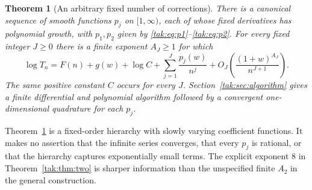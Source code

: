 \documentclass[11pt,letterpaper]{article}
\newtheorem{theorem}{Theorem}[section]
\theoremstyle{remark}\newtheorem{remark}[theorem]{Remark}
\begin{document}
\begin{theorem}[An arbitrary fixed number of corrections]\label{tak:thm:all}
There is a canonical sequence of smooth functions $p_j$ on $[1,\infty)$, each of whose fixed derivatives has polynomial growth, with $p_1,p_2$ given by \eqref{tak:eq:p1}--\eqref{tak:eq:p2}. For every fixed integer $J\geq0$ there is a finite exponent $A_J\geq1$ for which
\begin{equation}
 \log T_n=F(n)+g(w)+\log C+\sum_{j=1}^J\frac{p_j(w)}{n^j}
       +O_J\!\left(\frac{(1+w)^{A_J}}{n^{J+1}}\right).\label{tak:eq:all}
\end{equation}
The same positive constant $C$ occurs for every $J$. Section~\ref{tak:sec:algorithm} gives a finite differential and polynomial algorithm followed by a convergent one-dimensional quadrature for each $p_j$.
\end{theorem}
Theorem~\ref{tak:thm:all} is a fixed-order hierarchy with slowly varying coefficient functions. It makes no assertion that the infinite series converges, that every $p_j$ is rational, or that the hierarchy captures exponentially small terms. The explicit exponent $8$ in Theorem~\ref{tak:thm:two} is sharper information than the unspecified finite $A_2$ in the general construction.
\end{document}
